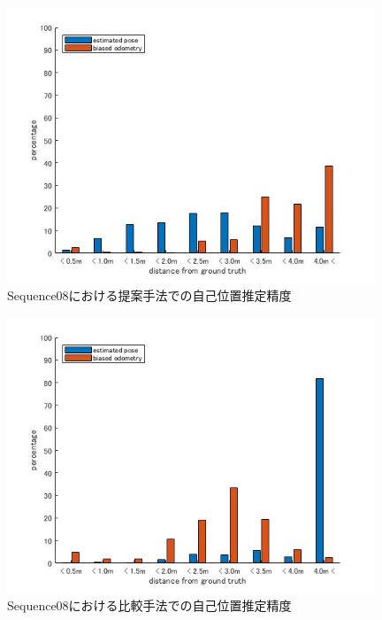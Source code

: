 \begin{figure}[htbp]
  \begin{minipage}{1.0\hsize}
  \begin{center}
   \includegraphics[width=110mm]{./picture/mesh_s8_xyz.jpg}
  \end{center}
  \caption{Sequence08における提案手法での自己位置推定精度}
  \label{fig:mesh_sequence08_XYZ}
 \end{minipage}
\end{figure}

\begin{figure}[htbp]
 \begin{minipage}{1.0\hsize}
  \begin{center}
   \includegraphics[width=110mm]{./picture/point_s8_xyz.jpg}
  \end{center}
  \caption{Sequence08における比較手法での自己位置推定精度}
  \label{fig:point_sequence08_XYZ}
 \end{minipage}
\end{figure}


